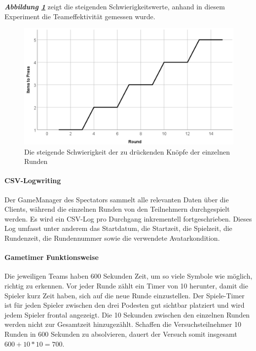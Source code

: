 \documentclass[a4paper,11pt]{article}%
\renewcommand{\\}{\vspace*{0.5\baselineskip} \newline}
\begin{document}
\textbf{\textit{Abbildung \ref{RoundDifficulty}}} zeigt die steigenden Schwierigkeitswerte, anhand in diesem Experiment die Teameffektivität gemessen wurde.

\begin{figure}[H]
		\begin{footnotesize}
		\centering
			\includegraphics[scale=0.4]{Abbildungen/RoundDifficulty.JPG}	
			\caption[Der Schwierigkeitsgrad der Runden]{Die steigende Schwierigkeit der zu drückenden Knöpfe der einzelnen Runden}
			\label{RoundDifficulty}
		\end{footnotesize}
	\end{figure}

\paragraph{CSV-Logwriting}
Der GameManager des Spectators sammelt alle relevanten Daten über die Clients, während die einzelnen Runden von den Teilnehmern durchgespielt werden. Es wird ein CSV-Log pro Durchgang inkrementell fortgeschrieben. Dieses Log umfasst unter anderem das Startdatum, die Startzeit, die Spielzeit, die Rundenzeit, die Rundennummer sowie die verwendete Avatarkondition.

\paragraph{Gametimer Funktionsweise}
Die jeweiligen Teams haben 600 Sekunden Zeit, um so viele Symbole wie möglich, richtig zu erkennen. Vor jeder Runde zählt ein Timer von 10 herunter, damit die Spieler kurz Zeit haben, sich auf die neue Runde einzustellen. Der Spiele-Timer ist für jeden Spieler zwischen den drei Podesten gut sichtbar platziert und wird jedem Spieler frontal angezeigt. Die 10 Sekunden zwischen den einzelnen Runden werden nicht zur Gesamtzeit hinzugezählt. Schaffen die Versuchsteilnehmer 10 Runden in 600 Sekunden zu absolvieren, dauert der Versuch somit insgesamt \\
$600 + 10 * 10 = 700$.
\end{document}
